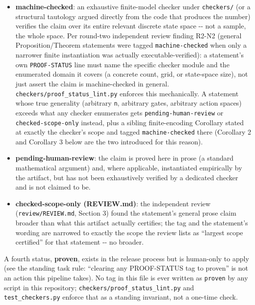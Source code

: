 \documentclass[11pt,a4paper]{article}
\theoremstyle{definition}
\begin{document}
\begin{itemize}
\item \textbf{machine-checked}: an exhaustive finite-model checker under \texttt{checkers/} (or a structural tautology argued directly from the code that produces the number) verifies the claim over its entire relevant discrete state space -{}- not a sample, the whole space. Per round-two independent review finding R2-N2 (general Proposition/Theorem statements were tagged \texttt{machine-checked} when only a narrower finite instantiation was actually executable-verified): a statement's own \texttt{PROOF-STATUS} line must name the specific checker module and the enumerated domain it covers (a concrete count, grid, or state-space size), not just assert the claim is machine-checked in general. \texttt{checkers/proof\_status\_lint.py} enforces this mechanically. A statement whose true generality (arbitrary \texttt{n}, arbitrary gates, arbitrary action spaces) exceeds what any checker enumerates gets \texttt{pending-human-review} or \texttt{checked-scope-only} instead, plus a sibling finite-encoding Corollary stated at exactly the checker's scope and tagged \texttt{machine-checked} there (Corollary 2 and Corollary 3 below are the two introduced for this reason).
\item \textbf{pending-human-review}: the claim is proved here in prose (a standard mathematical argument) and, where applicable, instantiated empirically by the artifact, but has not been exhaustively verified by a dedicated checker and is not claimed to be.
\item \textbf{checked-scope-only (REVIEW.md)}: the independent review (\texttt{review/REVIEW.md}, Section 3) found the statement's general prose claim broader than what this artifact actually certifies; the tag and the statement's wording are narrowed to exactly the scope the review lists as ``largest scope certified'' for that statement -{}- no broader.
\end{itemize}

A fourth status, \textbf{proven}, exists in the release process but is human-only to apply (see the standing task rule: ``clearing any PROOF-STATUS tag to proven'' is not an action this pipeline takes). No tag in this file is ever written as \texttt{proven} by any script in this repository; \texttt{checkers/proof\_status\_lint.py} and \texttt{test\_checkers.py} enforce that as a standing invariant, not a one-time check.
\end{document}
